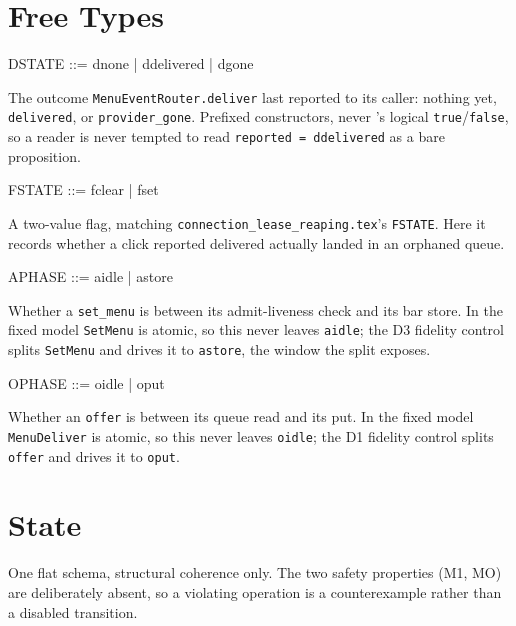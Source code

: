 \documentclass[a4paper,10pt,fleqn]{article}
\begin{document}
\section{Free Types}

\begin{zed}
  DSTATE ::= dnone | ddelivered | dgone
\end{zed}

The outcome \texttt{MenuEventRouter.deliver} last reported to its caller:
nothing yet, \texttt{delivered}, or \texttt{provider\_gone}. Prefixed
constructors, never \fuzz's logical \texttt{true}/\texttt{false}, so a reader
is never tempted to read \texttt{reported = ddelivered} as a bare
proposition.

\begin{zed}
  FSTATE ::= fclear | fset
\end{zed}

A two-value flag, matching \texttt{connection\_lease\_reaping.tex}'s
\texttt{FSTATE}. Here it records whether a click reported delivered actually
landed in an orphaned queue.

\begin{zed}
  APHASE ::= aidle | astore
\end{zed}

Whether a \texttt{set\_menu} is between its admit-liveness check and its bar
store. In the fixed model \texttt{SetMenu} is atomic, so this never leaves
\texttt{aidle}; the D3 fidelity control splits \texttt{SetMenu} and drives
it to \texttt{astore}, the window the split exposes.

\begin{zed}
  OPHASE ::= oidle | oput
\end{zed}

Whether an \texttt{offer} is between its queue read and its put. In the
fixed model \texttt{MenuDeliver} is atomic, so this never leaves
\texttt{oidle}; the D1 fidelity control splits \texttt{offer} and drives it
to \texttt{oput}.

\section{State}

One flat schema, structural coherence only. The two safety properties (M1,
MO) are deliberately absent, so a violating operation is a counterexample
rather than a disabled transition.
\end{document}
